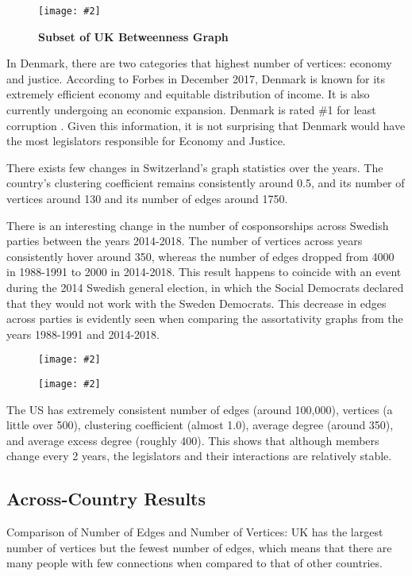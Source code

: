 \documentclass[12pt]{article}
\newcommand{\image}[4][0.6]{
  \begin{figure}[H]
    \centering
    \texttt{[image: \#2]}
    \begin{center}
      \caption[(details)]{\textbf{#4}}
    \end{center}
    \vspace{-2em}
    \label{fig:#2}
  \end{figure}}
\begin{document}
\begin{multicols*}{2}
\begin{center}
  \image[0.2]{Images/uk-betweenness.png}{uk-betweenness}{Subset of UK Betweenness Graph}
\end{center}

In Denmark, there are two categories that highest number of vertices: economy and justice. According to Forbes in December 2017, Denmark is known for its extremely efficient economy and equitable distribution of income. It is also currently undergoing an economic expansion. Denmark is rated \#1 for least corruption \cite{denmark}. Given this information, it is not surprising that Denmark would have the most legislators responsible for Economy and Justice.

There exists few changes in Switzerland's graph statistics over the years. The country's clustering coefficient remains consistently around 0.5, and its number of vertices around 130 and its number of edges around 1750. 

There is an interesting change in the number of cosponsorships across Swedish parties between the years 2014-2018. The number of vertices across years consistently hover around 350, whereas the number of edges dropped from 4000 in 1988-1991 to 2000 in 2014-2018. This result happens to coincide with an event during the 2014 Swedish general election, in which the Social Democrats declared that they would not work with the Sweden Democrats. This decrease in edges across parties is evidently seen when comparing the assortativity graphs from the years 1988-1991 and 2014-2018.

\image[0.3]{../plots/graph/sweden/assortativity/assortativity_net_se1988-1991.pdf}{}{}{}
\image[0.3]{../plots/graph/sweden/assortativity/assortativity_net_se2014-2018.pdf}{}{}{}

The US has extremely consistent number of edges (around 100,000), vertices (a little over 500), clustering coefficient (almost 1.0), average degree (around 350), and average excess degree (roughly 400). This shows that although members change every 2 years, the legislators and their interactions are relatively stable. 

\subsection{Across-Country Results}

Comparison of Number of Edges and Number of Vertices: UK has the largest number of vertices but the fewest number of edges, which means that there are many people with few connections when compared to that of other countries.


\end{multicols*}
\end{document}
